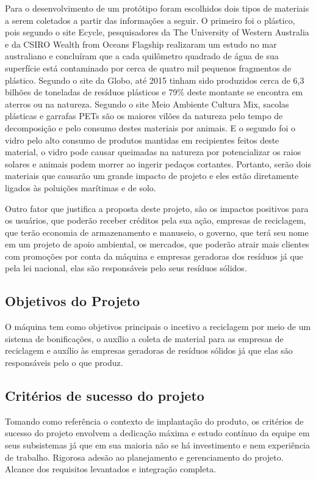 \begin{apendicesenv}
Para o desenvolvimento de um protótipo foram escolhidos dois tipos de materiais a serem coletados a partir das informações a seguir. O primeiro foi o plástico, pois segundo o site Ecycle, pesquisadores da The University of  Western Australia e da CSIRO Wealth from Oceans Flagship realizaram um estudo no mar australiano e concluíram que a cada quilômetro quadrado de água de sua superfície está contaminado por cerca de quatro mil pequenos fragmentos de plástico. Segundo o site da Globo, até 2015 tinham sido produzidos cerca de 6,3 bilhões de toneladas de resíduos plásticos e 79\% deste montante se encontra em aterros ou na natureza. Segundo o site Meio Ambiente Cultura Mix, sacolas plásticas e garrafas PETs são os maiores vilões da natureza pelo tempo de decomposição e pelo consumo destes materiais por animais. E o segundo foi o vidro pelo alto consumo de produtos mantidas em recipientes feitos deste material, o vidro pode causar queimadas na natureza por potencializar os raios solares e animais podem morrer ao ingerir pedaços cortantes. Portanto, serão dois materiais que causarão um grande impacto de projeto e eles estão diretamente ligados às poluições marítimas e de solo.

Outro fator que justifica a proposta deste projeto, são os impactos positivos para os usuários, que poderão receber créditos pela sua ação, empresas de reciclagem, que terão economia de armazenamento e manuseio, o governo, que terá seu nome em um projeto de apoio ambiental, os mercados, que poderão atrair mais clientes com promoções por conta da máquina e empresas geradoras dos resíduos já que pela lei nacional, elas são responsáveis pelo seus resíduos sólidos.

\subsection{Objetivos do Projeto}

O máquina tem como objetivos principais o incetivo a reciclagem por meio de um sistema de bonificações, o auxílio a coleta de material para as empresas de reciclagem e auxílio às empresas geradoras de resíduos sólidos já que elas são responsáveis pelo o que produz.

\subsection{Critérios de sucesso do projeto}

Tomando como referência o contexto de implantação do produto, os critérios de sucesso do projeto envolvem a dedicação máxima e estudo contínuo da equipe em seus subsistemas já que em sua maioria não se há investimento e nem experiência de trabalho. Rigorosa adesão ao planejamento e gerenciamento do projeto. Alcance dos requisitos levantados e integração completa.


\end{apendicesenv}
